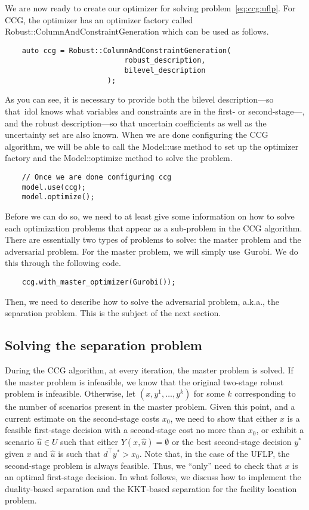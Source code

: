 We are now ready to create our optimizer for solving
problem~\eqref{eq:ccg:uflp}. For CCG, the optimizer has an optimizer factory
called \textsf{Robust::ColumnAndConstraintGeneration} which can be used as
follows. 
%
\begin{lstlisting}
    auto ccg = Robust::ColumnAndConstraintGeneration(
                            robust_description,
                            bilevel_description
                        );
\end{lstlisting}
As you can see, it is necessary to provide both the bilevel description---so
that~\textsf{idol} knows what variables and constraints are in the first- or
second-stage---, and the robust description---so that uncertain coefficients
as well as the uncertainty set are also known. When we are done configuring
the CCG algorithm, we will be able to call the \textsf{Model::use} method to
set up the optimizer factory and the \textsf{Model::optimize} method to solve
the problem.
%
\begin{lstlisting}
    // Once we are done configuring ccg
    model.use(ccg);
    model.optimize();
\end{lstlisting}
Before we can do so, we need to at least give some information on how to solve
each optimization problems that appear as a sub-problem in the CCG algorithm.
There are essentially two types of problems to solve: the master problem and
the adversarial problem. For the master problem, we will simply
use~\textsf{Gurobi}. We do this through the following code.
%
\begin{lstlisting}
    ccg.with_master_optimizer(Gurobi());
\end{lstlisting}
Then, we need to describe how to solve the adversarial problem, a.k.a., the
separation problem. This is the subject of the next section.

\subsection{Solving the separation problem}

During the CCG algorithm, at every iteration, the master problem is solved. If
the master problem is infeasible, we know that the original two-stage robust
problem is infeasible. Otherwise, let $(x,y^1,\dotsc,y^k)$ for some $k$
corresponding to the number of scenarios present in the master problem. Given
this point, and a current estimate on the second-stage costs $x_0$, we need to
show that either $x$ is a feasible first-stage decision with a second-stage
cost no more than $x_0$, or exhibit a scenario $\hat{u}\in U$ such that either
$Y(x,\hat{u}) = \emptyset$ or the best second-stage decision $y^*$ given $x$
and $\hat{u}$ is such that $d^\top y^* > x_0$. Note that, in the case of the
UFLP, the second-stage problem is always feasible. Thus, we ``only'' need to
check that $x$ is an optimal first-stage decision. In what follows, we discuss
how to implement the duality-based separation and the KKT-based separation for
the facility location problem. 

